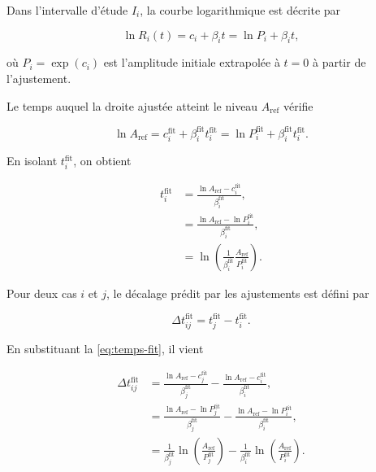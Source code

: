 \documentclass[
    11pt,
    a4paper
]{article}
\begin{document}
Dans l’intervalle d’étude \(I_i\), la courbe logarithmique est décrite par

\begin{equation}
    \ln R_i(t)
    =
    c_i+\beta_i t
    =
    \ln P_i+\beta_i t,
    \label{eq:modele-log-fit}
\end{equation}

où \(P_i=\exp(c_i)\) est l’amplitude initiale extrapolée à \(t=0\) à partir de
l’ajustement.

Le temps auquel la droite ajustée atteint le niveau \(A_{\mathrm{ref}}\) vérifie

\begin{equation}
    \ln A_{\mathrm{ref}}
    =
    c_i^{\mathrm{fit}}+\beta_i^{\mathrm{fit}} t_i^{\mathrm{fit}}
    =
    \ln P_i^{\mathrm{fit}}+\beta_i^{\mathrm{fit}} t_i^{\mathrm{fit}}.
    \label{eq:condition-fit-Aref}
\end{equation}

En isolant \(t_i^{\mathrm{fit}}\), on obtient

\begin{align}
    t_i^{\mathrm{fit}}
    &=
    \frac{\ln A_{\mathrm{ref}}-c_i^{\mathrm{fit}}}{\beta_i^{\mathrm{fit}}},
    \nonumber\\
    &=
    \frac{\ln A_{\mathrm{ref}}-\ln P_i^{\mathrm{fit}}}{\beta_i^{\mathrm{fit}}},
    \nonumber\\
    &=
    \ln\left(
        \frac{1}{\beta_i^{\mathrm{fit}}}
        \frac{A_{\mathrm{ref}}}{P_i^{\mathrm{fit}}}
    \right).
    \label{eq:temps-fit}
\end{align}

Pour deux cas \(i\) et \(j\), le décalage prédit par les ajustements est défini
par

\begin{equation}
    \Delta t_{ij}^{\mathrm{fit}}
    =
    t_j^{\mathrm{fit}}
    -
    t_i^{\mathrm{fit}}.
    \label{eq:decalage-fit}
\end{equation}

En substituant la \ref{eq:temps-fit}, il vient

\begin{align}
    \Delta t_{ij}^{\mathrm{fit}}
    &=
    \frac{\ln A_{\mathrm{ref}}-c_j^{\mathrm{fit}}}{\beta_j^{\mathrm{fit}}}
    -
    \frac{\ln A_{\mathrm{ref}}-c_i^{\mathrm{fit}}}{\beta_i^{\mathrm{fit}}},
    \nonumber\\
    &=
    \frac{\ln A_{\mathrm{ref}}-\ln P_j^{\mathrm{fit}}}{\beta_j^{\mathrm{fit}}}
    -
    \frac{\ln A_{\mathrm{ref}}-\ln P_i^{\mathrm{fit}}}{\beta_i^{\mathrm{fit}}},
    \nonumber\\
    &=
    \frac{1}{\beta_j^{\mathrm{fit}}}
    \ln\left(
        \frac{A_{\mathrm{ref}}}{P_j^{\mathrm{fit}}}
    \right)
    -
    \frac{1}{\beta_i^{\mathrm{fit}}}
    \ln\left(
        \frac{A_{\mathrm{ref}}}{P_i^{\mathrm{fit}}}
    \right).
    \label{eq:decalage-fit-general}
\end{align}
\end{document}
